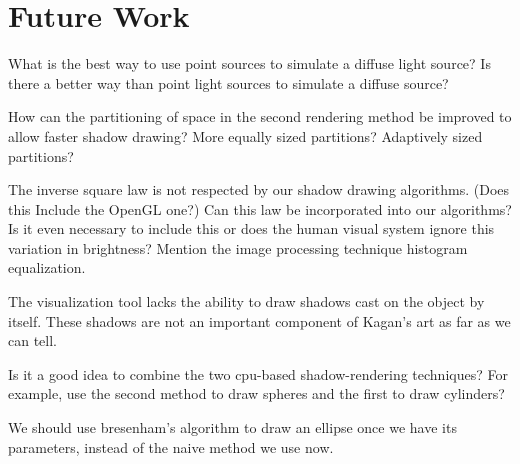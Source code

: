 \documentclass[10pt]{article}
\begin{document}
\section{Future Work}
What is the best way to use point sources to simulate a diffuse light source? Is there a better way than point light sources to simulate a diffuse source?

How can the partitioning of space in the second rendering method be improved to allow faster shadow drawing? More equally sized partitions? Adaptively sized partitions?

The inverse square law is not respected by our shadow drawing algorithms. (Does this Include the OpenGL one?) Can this law be incorporated into our algorithms? Is it even necessary to include this or does the human visual system ignore this variation in brightness? Mention the image processing technique histogram equalization.

The visualization tool lacks the ability to draw shadows cast on the object by itself. These shadows are not an important component of Kagan's art as far as we can tell.

Is it a good idea to combine the two cpu-based shadow-rendering techniques? For example, use the second method to draw spheres and the first to draw cylinders?

We should use bresenham's algorithm to draw an ellipse once we have its parameters, instead of the naive method we use now.
\end{document}
